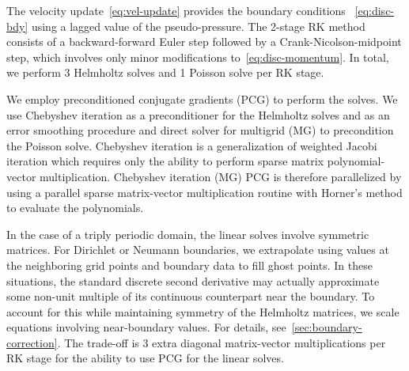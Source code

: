 The velocity update~\eqref{eq:vel-update} provides the boundary conditions~%
\eqref{eq:disc-bdy} using a lagged value of the pseudo-pressure. The 2-stage RK method
consists of a backward-forward Euler step followed by a Crank-Nicolson-midpoint step,
which involves only minor modifications to~\eqref{eq:disc-momentum}. In total, we perform
3 Helmholtz solves and 1 Poisson solve per RK stage.

We employ preconditioned conjugate gradients (PCG) to perform the solves. We use
Chebyshev iteration as a preconditioner for the Helmholtz solves and as an error
smoothing procedure and direct solver for multigrid (MG) to precondition the Poisson
solve. Chebyshev iteration is a generalization of weighted Jacobi iteration which
requires only the ability to perform sparse matrix polynomial-vector multiplication.
Chebyshev iteration (MG) PCG is therefore parallelized by using a parallel sparse
matrix-vector multiplication routine with Horner's method to evaluate the polynomials.

In the case of a triply periodic domain, the linear solves involve
symmetric matrices. For Dirichlet or Neumann boundaries, we extrapolate using values at
the neighboring grid points and boundary data to fill ghost points. In these situations,
the standard discrete second derivative may actually approximate some non-unit multiple
of its continuous counterpart near the boundary. To account for this while maintaining
symmetry of the Helmholtz matrices, we scale equations involving near-boundary values. For 
details, see~\ref{sec:boundary-correction}. The trade-off is
3 extra diagonal matrix-vector multiplications per RK stage for the ability to use PCG
for the linear solves. 

